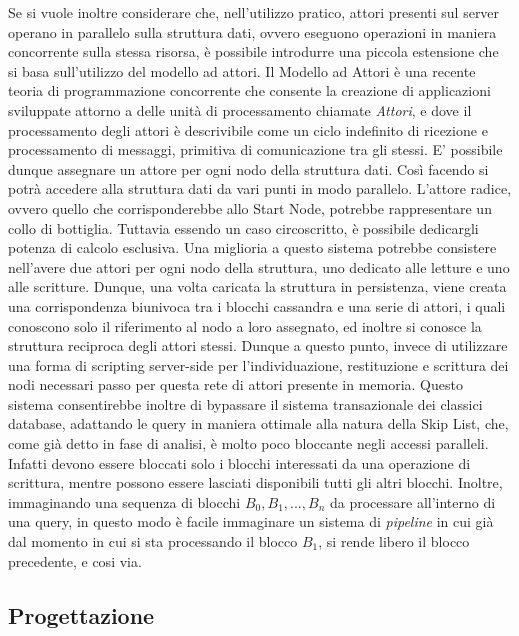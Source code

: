 		Se si vuole inoltre considerare che, nell'utilizzo pratico, attori presenti sul server operano in parallelo sulla struttura dati, ovvero eseguono operazioni in maniera concorrente sulla stessa risorsa, è possibile introdurre una piccola estensione che si basa sull'utilizzo del modello ad attori. Il Modello ad Attori è una recente teoria di programmazione concorrente che consente la creazione di applicazioni sviluppate attorno a delle unità di processamento chiamate \textit{Attori}, e dove il processamento degli attori è descrivibile come un ciclo indefinito di ricezione e processamento di messaggi, primitiva di comunicazione tra gli stessi.
		E' possibile dunque assegnare un attore per ogni nodo della struttura dati. Così facendo si potrà accedere alla struttura dati da vari punti in modo parallelo. L'attore radice, ovvero quello che corrisponderebbe allo Start Node, potrebbe rappresentare un collo di bottiglia. Tuttavia essendo un caso circoscritto, è possibile dedicargli potenza di calcolo esclusiva. Una miglioria a questo sistema potrebbe consistere nell'avere due attori per ogni nodo della struttura, uno dedicato alle letture e uno alle scritture.
		Dunque, una volta caricata la struttura in persistenza, viene creata una corrispondenza biunivoca tra i blocchi cassandra e una serie di attori, i quali conoscono solo il riferimento al nodo a loro assegnato, ed inoltre si conosce la struttura reciproca degli attori stessi. Dunque a questo punto, invece di utilizzare una forma di scripting server-side per l'individuazione, restituzione e scrittura dei nodi necessari passo per questa rete di attori presente in memoria.
		Questo sistema consentirebbe inoltre di bypassare il sistema transazionale dei classici database, adattando le query in maniera ottimale alla natura della Skip List, che, come già detto in fase di analisi, è molto poco bloccante negli accessi paralleli. Infatti devono essere bloccati solo i blocchi interessati da una operazione di scrittura, mentre possono essere lasciati disponibili tutti gli altri blocchi. Inoltre, immaginando una sequenza di blocchi $ B_{0}, B_{1}, ..., B_{n} $ da processare all'interno di una query, in questo modo è facile immaginare un sistema di \textit{pipeline} in cui già dal momento in cui si sta processando il blocco $ B_{1} $, si rende libero il blocco precedente, e cosi via.

	\subsection{Progettazione}


